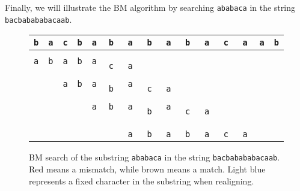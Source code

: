 \documentclass[a4paper, openany]{memoir}
\begin{document}
Finally, we will illustrate the BM algorithm by searching \texttt{ababaca} in the string \texttt{bacbabababacaab}. 
\begin{figure}[H]
    \centering
    \begin{tabular}{ccccccccccccccc}
        \texttt{b} & \texttt{a} & \texttt{c} & \texttt{b} & \texttt{a} & \texttt{b} & \texttt{a} & \texttt{b} & \texttt{a} & \texttt{b} & \texttt{a} & \texttt{c} & \texttt{a} & \texttt{a} & \texttt{b} \\
        \hline
        \texttt{a} & \texttt{b} & \texttt{a} & \texttt{b} & \texttt{a} & \texttt{\color{red} c} & \texttt{\color{brown} a} \\
        & & \texttt{a} & \texttt{b} & \texttt{a} & \texttt{\color{cyan} b} & \texttt{a} & \texttt{\color{red} c} & \texttt{\color{brown} a} \\
        & & & & \texttt{a} & \texttt{b} & \texttt{a} & \texttt{\color{cyan} b} & \texttt{a} & \texttt{\color{red} c} & \texttt{\color{brown} a} \\
        & & & & & & \texttt{\color{brown} a} & \texttt{\color{brown} b} & \texttt{\color{brown} a} & \texttt{\color{cyan} b} & \texttt{\color{brown} a} & \texttt{\color{brown} c} & \texttt{\color{brown} a} 
    \end{tabular}
    \caption{BM search of the substring \texttt{ababaca} in the string \texttt{bacbabababacaab}. Red means a mismatch, while brown means a match. Light blue represents a fixed character in the substring when realigning.}
\end{figure}
\end{document}

